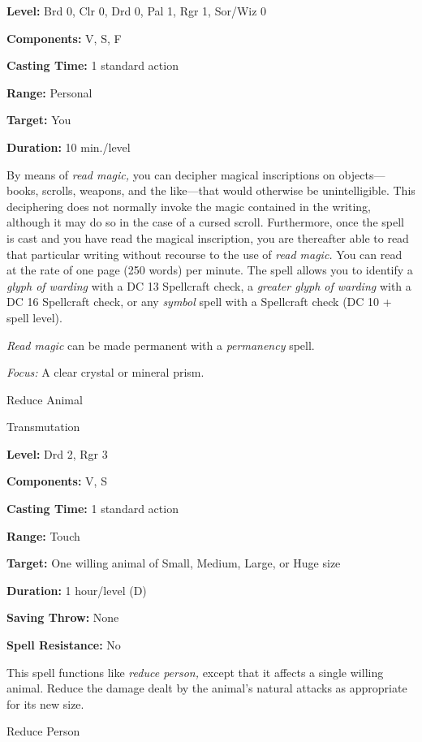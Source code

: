 \documentclass{article}
\begin{document}
\textbf{Level:} Brd 0, Clr 0, Drd 0, Pal 1, Rgr 1, Sor/Wiz 0

\textbf{Components:} V, S, F

\textbf{Casting Time:} 1 standard action

\textbf{Range:} Personal

\textbf{Target:} You

\textbf{Duration:} 10 min./level

By means of \textit{read magic, }you can decipher magical inscriptions on objects---books, 
scrolls, weapons, and the like---that would otherwise be unintelligible. This deciphering 
does not normally invoke the magic contained in the writing, although it may do 
so in the case of a cursed scroll. Furthermore, once the spell is cast and you 
have read the magical inscription, you are thereafter able to read that particular 
writing without recourse to the use of \textit{read magic. }You can read at the 
rate of one page (250 words) per minute. The spell allows you to identify a \textit{glyph 
of warding }with a DC 13 Spellcraft check, a \textit{greater glyph of warding }with 
a DC 16 Spellcraft check, or any \textit{symbol }spell with a Spellcraft check 
(DC 10 + spell level).

\textit{Read magic }can be made permanent with a \textit{permanency }spell.

\textit{Focus: }A clear crystal or mineral prism.

\vspace{12pt}
Reduce Animal

Transmutation

\textbf{Level:} Drd 2, Rgr 3

\textbf{Components:} V, S

\textbf{Casting Time:} 1 standard action

\textbf{Range:} Touch

\textbf{Target:} One willing animal of Small, Medium, Large, or Huge size

\textbf{Duration:} 1 hour/level (D)

\textbf{Saving Throw:} None

\textbf{Spell Resistance:} No

This spell functions like \textit{reduce person, }except that it affects a single 
willing animal. Reduce the damage dealt by the animal's natural attacks as appropriate 
for its new size.

\vspace{12pt}
Reduce Person
\end{document}
